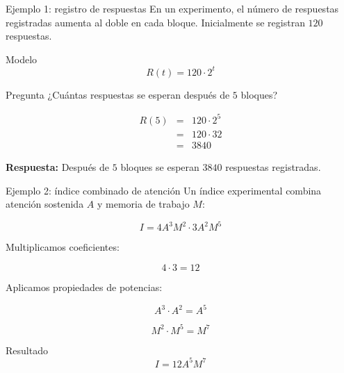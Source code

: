 \documentclass[handout,aspectratio=169]{beamer}
\begin{document}
	\begin{frame}{Ejemplo 1: registro de respuestas}
		En un experimento, el número de respuestas registradas aumenta al doble en cada bloque.  
		Inicialmente se registran \(120\) respuestas.
		
		\pause
		
		\begin{block}{Modelo}
			\[
			R(t)=120\cdot2^t
			\]
		\end{block}
		
		\pause
		
		\begin{exampleblock}{Pregunta}
			¿Cuántas respuestas se esperan después de \(5\) bloques?
		\end{exampleblock}
		
		\pause
		
	\[
	\begin{array}{rcl}
		R(5) & = & 120\cdot 2^5 \\[0.3cm]
		& = & 120\cdot 32 \\[0.3cm]
		& = & 3840
	\end{array}
	\]
		
		\pause
		
		\textbf{Respuesta:} 
			Después de \(5\) bloques se esperan \(3840\) respuestas registradas.
	\end{frame}
	
	
	\begin{frame}{Ejemplo 2: índice combinado de atención}
		Un índice experimental combina atención sostenida \(A\) y memoria de trabajo \(M\):
		
		\[
		I=4A^3M^2\cdot3A^2M^5
		\]
		
		\pause
		
		Multiplicamos coeficientes:
		
		\[
		4\cdot3=12
		\]
		
		\pause
		
		Aplicamos propiedades de potencias:
		
		\[
		A^3\cdot A^2=A^5
		\]
		
		\[
		M^2\cdot M^5=M^7
		\]
		
		\pause
		
		\begin{block}{Resultado}
			\[
			I=12A^5M^7
			\]
		\end{block}
	\end{frame}
	
	
\end{document}
